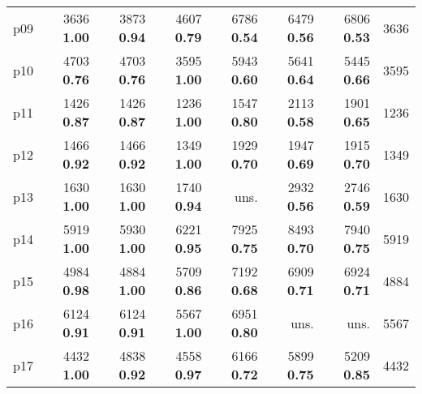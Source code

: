 \begin{tabular}{lrrrrrrr}
\multicolumn{1}{l|}{p09} & {\footnotesize 3636} \textbf{1.00} & {\footnotesize 3873} \textbf{0.94} & {\footnotesize 4607} \textbf{0.79} & {\footnotesize 6786} \textbf{0.54} & {\footnotesize 6479} \textbf{0.56} & {\footnotesize 6806} \textbf{0.53} & \multicolumn{1}{|r}{3636}\\
\multicolumn{1}{l|}{p10} & {\footnotesize 4703} \textbf{0.76} & {\footnotesize 4703} \textbf{0.76} & {\footnotesize 3595} \textbf{1.00} & {\footnotesize 5943} \textbf{0.60} & {\footnotesize 5641} \textbf{0.64} & {\footnotesize 5445} \textbf{0.66} & \multicolumn{1}{|r}{3595}\\
\multicolumn{1}{l|}{p11} & {\footnotesize 1426} \textbf{0.87} & {\footnotesize 1426} \textbf{0.87} & {\footnotesize 1236} \textbf{1.00} & {\footnotesize 1547} \textbf{0.80} & {\footnotesize 2113} \textbf{0.58} & {\footnotesize 1901} \textbf{0.65} & \multicolumn{1}{|r}{1236}\\
\multicolumn{1}{l|}{p12} & {\footnotesize 1466} \textbf{0.92} & {\footnotesize 1466} \textbf{0.92} & {\footnotesize 1349} \textbf{1.00} & {\footnotesize 1929} \textbf{0.70} & {\footnotesize 1947} \textbf{0.69} & {\footnotesize 1915} \textbf{0.70} & \multicolumn{1}{|r}{1349}\\
\multicolumn{1}{l|}{p13} & {\footnotesize 1630} \textbf{1.00} & {\footnotesize 1630} \textbf{1.00} & {\footnotesize 1740} \textbf{0.94} & uns. & {\footnotesize 2932} \textbf{0.56} & {\footnotesize 2746} \textbf{0.59} & \multicolumn{1}{|r}{1630}\\
\multicolumn{1}{l|}{p14} & {\footnotesize 5919} \textbf{1.00} & {\footnotesize 5930} \textbf{1.00} & {\footnotesize 6221} \textbf{0.95} & {\footnotesize 7925} \textbf{0.75} & {\footnotesize 8493} \textbf{0.70} & {\footnotesize 7940} \textbf{0.75} & \multicolumn{1}{|r}{5919}\\
\multicolumn{1}{l|}{p15} & {\footnotesize 4984} \textbf{0.98} & {\footnotesize 4884} \textbf{1.00} & {\footnotesize 5709} \textbf{0.86} & {\footnotesize 7192} \textbf{0.68} & {\footnotesize 6909} \textbf{0.71} & {\footnotesize 6924} \textbf{0.71} & \multicolumn{1}{|r}{4884}\\
\multicolumn{1}{l|}{p16} & {\footnotesize 6124} \textbf{0.91} & {\footnotesize 6124} \textbf{0.91} & {\footnotesize 5567} \textbf{1.00} & {\footnotesize 6951} \textbf{0.80} & uns. & uns. & \multicolumn{1}{|r}{5567}\\
\multicolumn{1}{l|}{p17} & {\footnotesize 4432} \textbf{1.00} & {\footnotesize 4838} \textbf{0.92} & {\footnotesize 4558} \textbf{0.97} & {\footnotesize 6166} \textbf{0.72} & {\footnotesize 5899} \textbf{0.75} & {\footnotesize 5209} \textbf{0.85} & \multicolumn{1}{|r}{4432}\\

\end{tabular}
